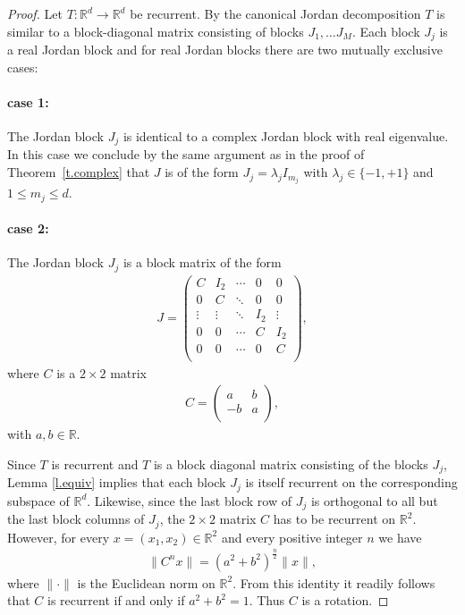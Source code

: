 \documentclass[12pt,leqno]{amsart}
\theoremstyle{plain}
\theoremstyle{definition}
\numberwithin{equation}{section}
\begin{document}
\begin{proof}
	Let $T:{\mathbb R}^d\to {\mathbb R}^d$ be recurrent. By the canonical Jordan decomposition $T$ is similar to a block-diagonal matrix consisting of blocks $J_1,\ldots J_M$. Each block $J_j$ is a real Jordan block and for real Jordan blocks there are two mutually exclusive cases:
\paragraph{\textbf{case 1:}} The Jordan block $J_j$ is identical to a complex Jordan block with real eigenvalue. In this case we conclude by the same argument as in the proof of Theorem~\ref{t.complex} that $J$ is of the form $J_j=\lambda_j I_{m_j}$ with $\lambda_j \in\{-1,+1\}$ and $1\leq m_j \leq d$. 
\paragraph{\textbf{case 2:}} The Jordan block $J_j$ is a block matrix of the form
	\begin{align}\label{e.jordanreal}
		 J= 
		\begin{pmatrix}
			C &I_2 & \cdots&0 &0 \\
			0 & C & \ddots &0 & 0 \\
			\vdots & \vdots & \ddots & I_2 &\vdots \\
			0 & 0 & \cdots &C & I_2 \\
			0 & 0 & \cdots & 0 & C\\
		\end{pmatrix}
		, 
	\end{align}
	where $C$ is a $2\times 2$ matrix
	\begin{align*}
		C = 
		\begin{pmatrix}
			a & b \\
			-b & a\\
		\end{pmatrix}
		,
	\end{align*}
with $a,b\in{\mathbb R}$.
	
	Since $T$ is recurrent and $T$ is a block diagonal matrix consisting of the blocks $J_j$, Lemma \ref{l.equiv} implies that each block $J_j$ is itself recurrent on the corresponding subspace of ${\mathbb R}^d$. Likewise, since the last block row of $J_j$ is orthogonal to all but the last block columns of $J_j$, the $2\times 2$ matrix $C$ has to be recurrent on ${\mathbb R}^2$. However, for every $x=(x_1,x_2) \in{\mathbb R}^2$ and every positive integer $n$ we have 
	\begin{align*}
		\|C^n x\|=(a^2+b^2)^\frac{n}{2}\|x\|, 
	\end{align*}
	where $\|\cdot\|$ is the Euclidean norm on ${\mathbb R}^2$. From this identity it readily follows that $C$ is recurrent if and only if $a^2+b^2=1$. Thus $C$ is a rotation. 
	

\end{proof}
\end{document}
